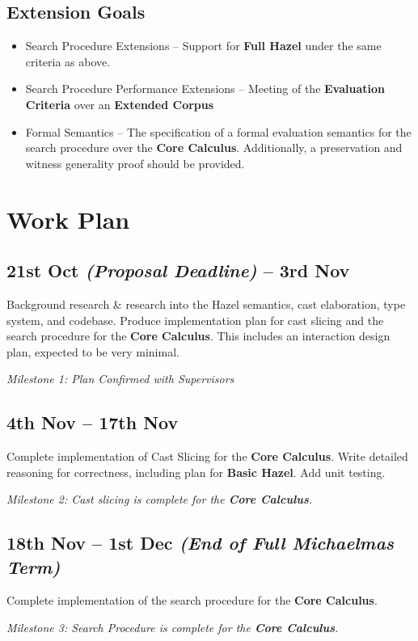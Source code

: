 \subsection{Extension Goals}
\begin{itemize}
\item Search Procedure Extensions -- Support for \textbf{Full Hazel} under the same criteria as above.
\item Search Procedure Performance Extensions -- Meeting of the \textbf{Evaluation Criteria} over an \textbf{Extended Corpus}
\item Formal Semantics -- The specification of a formal evaluation semantics for the search procedure over the \textbf{Core Calculus}. Additionally, a preservation and witness generality proof should be provided.
\end{itemize}

\section{Work Plan}
\subsection*{21st Oct \textit{(Proposal Deadline)} -- 3rd Nov}
Background research \& research into the Hazel semantics, cast elaboration, type system, and codebase. Produce implementation plan for cast slicing and the search procedure for the \textbf{Core Calculus}. This includes an interaction design plan, expected to be very minimal.\par
\textit{Milestone 1: Plan Confirmed with Supervisors}

\subsection*{4th Nov -- 17th Nov}
Complete implementation of Cast Slicing for the \textbf{Core Calculus}. Write detailed reasoning for correctness, including plan for \textbf{Basic Hazel}. Add unit testing.\par 
\textit{Milestone 2: Cast slicing is complete for the \textbf{Core Calculus}.}

\subsection*{18th Nov -- 1st Dec \textit{(End of Full Michaelmas Term)}}
Complete implementation of the search procedure for the \textbf{Core Calculus}. \par 
\textit{Milestone 3: Search Procedure is complete for the \textbf{Core Calculus}.}


